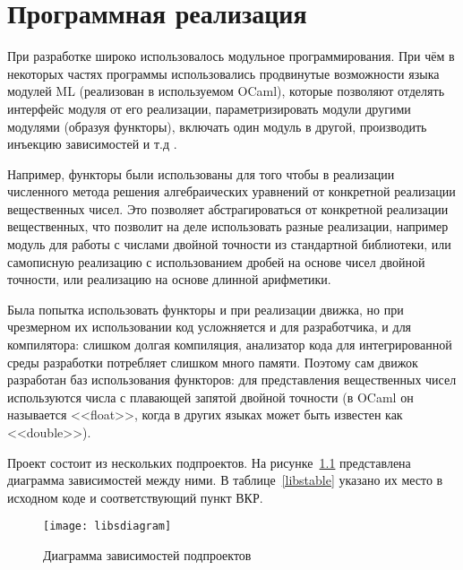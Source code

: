 \chapter{Программная реализация}\label{chapter-impl}

При разработке широко использовалось модульное программирования. При чём в некоторых частях программы использовались
продвинутые возможности языка модулей ML (реализован в используемом OCaml), которые позволяют
отделять интерфейс модуля от его реализации,
параметризировать модули другими модулями (образуя функторы),
включать один модуль в другой, \cite{wiki-mlmodules}
производить инъекцию зависимостей и т.д \cite{functor-driven}.

Например, функторы были использованы для того чтобы в реализации численного метода решения алгебраических уравнений
от конкретной реализации вещественных чисел. Это позволяет абстрагироваться от конкретной реализации вещественных,
что позволит на деле использовать разные реализации, например модуль для работы с числами двойной точности из стандартной библиотеки,
или самописную реализацию с использованием дробей на основе чисел двойной точности, или реализацию на основе длинной арифметики.

Была попытка использовать функторы и при реализации движка, но при чрезмерном их использовании код усложняется и для разработчика,
и для компилятора: слишком долгая компиляция, анализатор кода для интегрированной среды разработки потребляет слишком много памяти.
Поэтому сам движок разработан баз использования функторов: для представления вещественных чисел используются числа
с плавающей запятой двойной точности (в OCaml он называется <<float>>, когда в других языках может быть известен как <<double>>).

Проект состоит из нескольких подпроектов. На рисунке~\ref{libsdiagramfig} представлена диаграмма зависимостей между ними.
В таблице~\ref{libstable} указано их место в исходном коде и соответствующий пункт ВКР.

\begin{figure}[H]
    \centering
    \texttt{[image: libsdiagram]}
    \caption{Диаграмма зависимостей подпроектов\label{libsdiagramfig}}
\end{figure}

